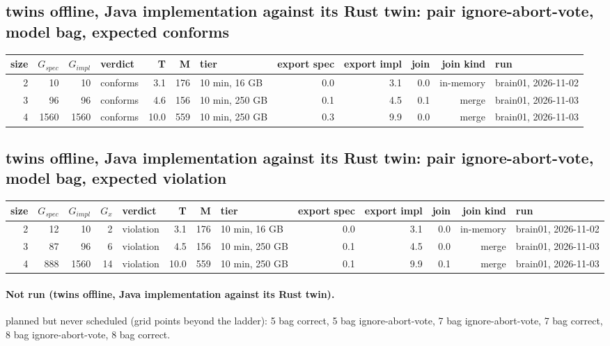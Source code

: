 \documentclass[10pt]{article}
\begin{document}
\subsection*{twins offline, Java implementation against its Rust twin: pair \textsf{ignore-abort-vote}, model bag, expected conforms}
\begin{longtable}{@{}rrrlrrlrrrrl@{}}
\toprule
size & $G_{\mathit{spec}}$ & $G_{\mathit{impl}}$ & verdict & T & M & tier & export spec & export impl & join & join kind & run \\
\midrule
\endhead
\color{red} 2 & 10 & 10 & conforms & 3.1 & 176 & 10 min, 16 GB & 0.0 & 3.1 & 0.0 & in-memory & brain01, 2026-11-02 \\
\color{blue} 3 & 96 & 96 & conforms & 4.6 & 156 & 10 min, 250 GB & 0.1 & 4.5 & 0.1 & merge & brain01, 2026-11-03 \\
\color{blue} 4 & 1560 & 1560 & conforms & 10.0 & 559 & 10 min, 250 GB & 0.3 & 9.9 & 0.0 & merge & brain01, 2026-11-03 \\
\bottomrule
\end{longtable}
\subsection*{twins offline, Java implementation against its Rust twin: pair \textsf{ignore-abort-vote}, model bag, expected violation}
\begin{longtable}{@{}rrrrlrrlrrrrl@{}}
\toprule
size & $G_{\mathit{spec}}$ & $G_{\mathit{impl}}$ & $G_x$ & verdict & T & M & tier & export spec & export impl & join & join kind & run \\
\midrule
\endhead
\color{red} 2 & 12 & 10 & 2 & violation & 3.1 & 176 & 10 min, 16 GB & 0.0 & 3.1 & 0.0 & in-memory & brain01, 2026-11-02 \\
\color{blue} 3 & 87 & 96 & 6 & violation & 4.5 & 156 & 10 min, 250 GB & 0.1 & 4.5 & 0.0 & merge & brain01, 2026-11-03 \\
\color{blue} 4 & 888 & 1560 & 14 & violation & 10.0 & 559 & 10 min, 250 GB & 0.1 & 9.9 & 0.1 & merge & brain01, 2026-11-03 \\
\bottomrule
\end{longtable}
\paragraph{Not run (twins offline, Java implementation against its Rust twin).}
planned but never scheduled (grid points beyond the ladder): 5 bag correct, 5 bag ignore-abort-vote, 7 bag ignore-abort-vote, 7 bag correct, 8 bag ignore-abort-vote, 8 bag correct.\par
\end{document}
